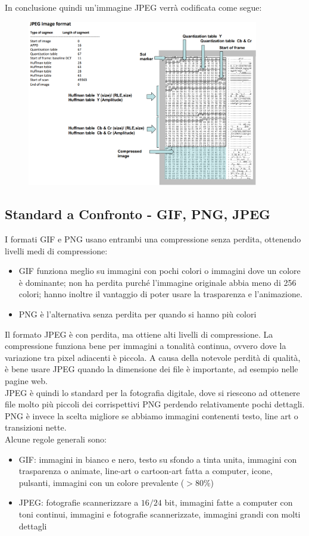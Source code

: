 \documentclass[a4paper,11pt]{article} %
\begin{document}
In conclusione quindi un'immagine JPEG verrà codificata come segue: 
\begin{figure} [h]
\centering
\includegraphics[width=0.9\textwidth]{JPEG format}
\end{figure}

\newpage
\subsection{Standard a Confronto - GIF, PNG, JPEG}
I formati GIF e PNG usano entrambi una compressione senza perdita, ottenendo livelli medi di compressione: 
\begin{itemize}
\item GIF funziona meglio su immagini con pochi colori o immagini dove un colore è dominante; non ha perdita purché l'immagine originale abbia meno di 256 colori; hanno inoltre il vantaggio di poter usare la trasparenza e l'animazione.
\item PNG è l'alternativa senza perdita per quando si hanno più colori
\end{itemize}
Il formato JPEG è con perdita, ma ottiene alti livelli di compressione. La compressione funziona bene per immagini a tonalità continua, ovvero dove la variazione tra pixel adiacenti è piccola. A causa della notevole perdità di qualità, è bene usare JPEG quando la dimensione dei file è importante, ad esempio nelle pagine web.\\
JPEG è quindi lo standard per la fotografia digitale, dove si riescono ad ottenere file molto più piccoli dei corrispettivi PNG perdendo relativamente pochi dettagli. PNG è invece la scelta migliore se abbiamo immagini contenenti testo, line art o transizioni nette.\\
Alcune regole generali sono: 
\begin{itemize}
\item GIF: immagini in bianco e nero, testo su sfondo a tinta unita, immagini con trasparenza o animate, line-art o cartoon-art fatta a computer, icone, pulsanti, immagini con un colore prevalente ($>80\%$)
\item JPEG: fotografie scannerizzare a $16/24$ bit, immagini fatte a computer con toni continui, immagini e fotografie scannerizzate, immagini grandi con molti dettagli 
\end{itemize}
\end{document}

